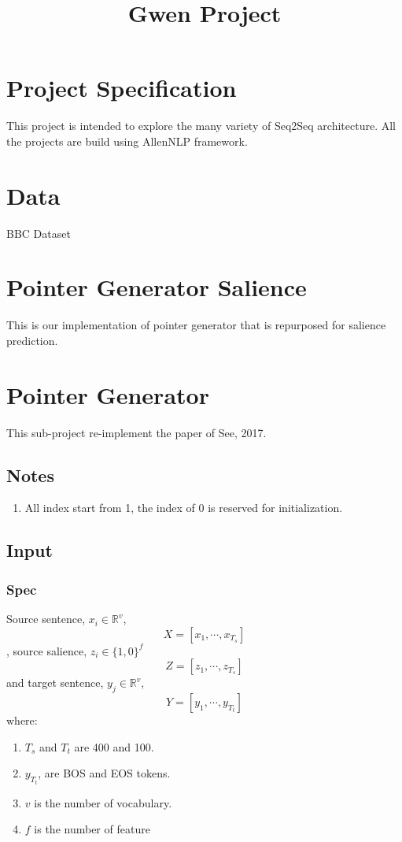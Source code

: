 \documentclass{article}
\title{Gwen Project}
\begin{document}
\section{Project Specification}
  This project is intended to explore the many variety of Seq2Seq architecture.
  All the projects are build using AllenNLP framework.
\section{Data}
  BBC Dataset
\section{Pointer Generator Salience}
  This is our implementation of pointer generator that is repurposed for salience prediction.

\section{Pointer Generator}
  This sub-project re-implement the paper of See, 2017.
  \subsection{Notes}
  \begin{enumerate}
    \item All index start from 1, the index of 0 is reserved for initialization.
  \end{enumerate}
  \subsection{Input}
  \subsubsection{Spec}
  Source sentence, $x_i \in \mathbb{R}^v$,
  \[
    X = [x_1, \cdots, x_{T_s}]
  \], source salience, $z_i \in \{1,0\}^f$
  \[
    Z = [z_1, \cdots, z_{T_s}]
  \]
  and target sentence, $y_j \in \mathbb{R}^v$,
  \[
    Y = [y_1, \cdots, y_{T_t}]
  \] 
  where:
  \begin{enumerate}
    \item $T_s$ and $T_t$ are 400 and 100.
    \item $y_{T_t}$, are BOS and EOS tokens.
    \item $v$ is the number of vocabulary.
    \item $f$ is the number of feature
  \end{enumerate}
\end{document}
